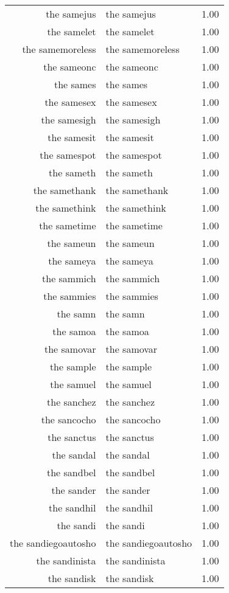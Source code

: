 \begin{table}[ht]
\begin{tabular}{rlr}
  the samejus & the samejus & 1.00 \\ 
  the samelet & the samelet & 1.00 \\ 
  the samemoreless & the samemoreless & 1.00 \\ 
  the sameonc & the sameonc & 1.00 \\ 
  the sames & the sames & 1.00 \\ 
  the samesex & the samesex & 1.00 \\ 
  the samesigh & the samesigh & 1.00 \\ 
  the samesit & the samesit & 1.00 \\ 
  the samespot & the samespot & 1.00 \\ 
  the sameth & the sameth & 1.00 \\ 
  the samethank & the samethank & 1.00 \\ 
  the samethink & the samethink & 1.00 \\ 
  the sametime & the sametime & 1.00 \\ 
  the sameun & the sameun & 1.00 \\ 
  the sameya & the sameya & 1.00 \\ 
  the sammich & the sammich & 1.00 \\ 
  the sammies & the sammies & 1.00 \\ 
  the samn & the samn & 1.00 \\ 
  the samoa & the samoa & 1.00 \\ 
  the samovar & the samovar & 1.00 \\ 
  the sample & the sample & 1.00 \\ 
  the samuel & the samuel & 1.00 \\ 
  the sanchez & the sanchez & 1.00 \\ 
  the sancocho & the sancocho & 1.00 \\ 
  the sanctus & the sanctus & 1.00 \\ 
  the sandal & the sandal & 1.00 \\ 
  the sandbel & the sandbel & 1.00 \\ 
  the sander & the sander & 1.00 \\ 
  the sandhil & the sandhil & 1.00 \\ 
  the sandi & the sandi & 1.00 \\ 
  the sandiegoautosho & the sandiegoautosho & 1.00 \\ 
  the sandinista & the sandinista & 1.00 \\ 
  the sandisk & the sandisk & 1.00 \\ 

\end{tabular}
\end{table}
